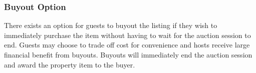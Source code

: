 \subsubsection{Buyout Option}
There exists an option for guests to buyout the listing if they wish to immediately purchase
the item without having to wait for the auction session to end. Guests may choose to
trade off cost for convenience and hosts receive large financial benefit from buyouts.
Buyouts will immediately end the auction session and award the property item to the buyer.

